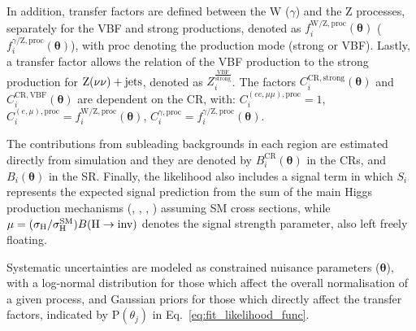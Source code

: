 In addition, transfer factors are defined between the W ($\gamma$) and
the Z processes, separately for the VBF and strong productions,
denoted as $f^{\mathrm{W/Z,proc}}_{i}(\boldsymbol{\theta})$
($f^{\gamma\mathrm{/Z,proc}}_{i}(\boldsymbol{\theta})$), with
proc denoting the production mode (strong or VBF). Lastly, a transfer factor allows the
relation of the VBF production to the strong production for $\textrm{Z}(\nu\nu)+\textrm{jets}$,
denoted as $Z^{\frac{\mathrm{VBF}}{\mathrm{strong}}}_{i}$. The factors
$C^{\mathrm{CR,strong}}_{i}(\boldsymbol{\theta})$ and
$C^{\mathrm{CR,VBF}}_{i}(\boldsymbol{\theta})$ are dependent on the
CR, with: $C^{(ee,\mu\mu)\mathrm{,proc}}_{i} =
1$, $C^{(e,\mu)\mathrm{,proc}}_{i} =
f^{\mathrm{W/Z,proc}}_{i}(\boldsymbol{\theta})$,
$C^{\gamma\mathrm{,proc}}_{i} =
f^{\gamma\mathrm{/Z,proc}}_{i}(\boldsymbol{\theta})$.

The contributions from subleading backgrounds in each region are
estimated directly from simulation and they are denoted by
$B^{\mathrm{CR}}_{i}(\boldsymbol{\theta})$ in the CRs, and
$B_{i}(\boldsymbol{\theta})$ in the SR. Finally, the likelihood also
includes a signal term in which $S_i$ represents the expected signal
prediction from the sum of the main Higgs production mechanisms
(\ggH, \vbf, \vh, \tth) assuming SM cross sections, while $\mu
= (\sigma_{\mathrm{H}}/\sigma_{\mathrm{H}}^{\mathrm{SM}}) {B(\textrm{H}\rightarrow\text{inv})}$ denotes the signal strength parameter, also left freely
floating.

Systematic uncertainties are modeled as constrained nuisance
parameters ($\boldsymbol{\theta}$), with a log-normal distribution for
those which affect the overall normalisation of a given process, and
Gaussian priors for those which directly affect the transfer factors,
indicated by $\mathrm{P}(\theta_{j})$ in Eq.~\ref{eq:fit_likelihood_func}.

% 
% 


